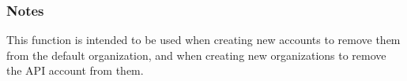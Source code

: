 \documentclass[letterpaper,10pt,english]{sphinxmanual}
\begin{document}
\begin{fulllineitems}
\begin{quote}
\begin{description}
\begin{description}
\end{description}

\end{description}\end{quote}






\subsubsection*{Notes}

This function is intended to be used when creating new accounts to remove them
from the default organization, and when creating new organizations to remove
the API account from them.

\end{fulllineitems}

\end{document}

